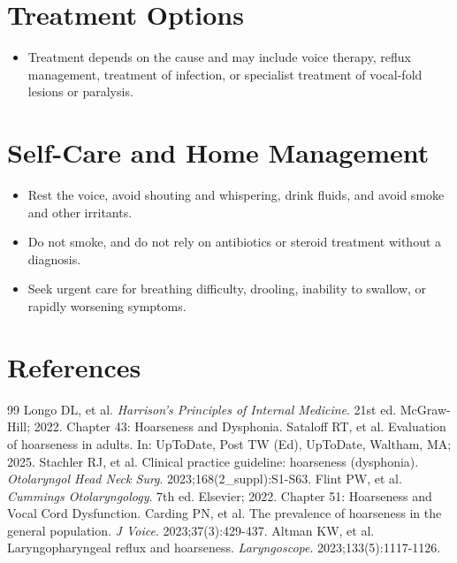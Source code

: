 \section*{Treatment Options}
\begin{itemize}
  \item Treatment depends on the cause and may include voice therapy, reflux management, treatment of infection, or specialist treatment of vocal-fold lesions or paralysis.
\end{itemize}

\section*{Self-Care and Home Management}
\begin{itemize}
  \item Rest the voice, avoid shouting and whispering, drink fluids, and avoid smoke and other irritants.
  \item Do not smoke, and do not rely on antibiotics or steroid treatment without a diagnosis.
  \item Seek urgent care for breathing difficulty, drooling, inability to swallow, or rapidly worsening symptoms.
\end{itemize}

\section*{References}

\begin{thebibliography}{99}
 Longo DL, et al. \emph{Harrison's Principles of Internal Medicine}. 21st ed. McGraw-Hill; 2022. Chapter 43: Hoarseness and Dysphonia.
 Sataloff RT, et al. Evaluation of hoarseness in adults. In: UpToDate, Post TW (Ed), UpToDate, Waltham, MA; 2025.
 Stachler RJ, et al. Clinical practice guideline: hoarseness (dysphonia). \emph{Otolaryngol Head Neck Surg}. 2023;168(2\_suppl):S1-S63.
 Flint PW, et al. \emph{Cummings Otolaryngology}. 7th ed. Elsevier; 2022. Chapter 51: Hoarseness and Vocal Cord Dysfunction.
 Carding PN, et al. The prevalence of hoarseness in the general population. \emph{J Voice}. 2023;37(3):429-437.
 Altman KW, et al. Laryngopharyngeal reflux and hoarseness. \emph{Laryngoscope}. 2023;133(5):1117-1126.
\end{thebibliography}
